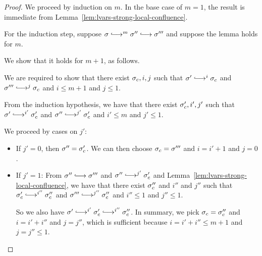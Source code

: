 \begin{proof}
  We proceed by induction on $m$.  In the base case of $m = 1$, the
  result is immediate from
  Lemma~\ref{lem:lvars-strong-local-confluence}.

  For the induction step, suppose $\conf \parstepsto^m \conf''
  \parstepsto \conf'''$ and suppose the lemma holds for $m$.

  We show that it holds for $m + 1$, as follows.

  We are required to show that there exist $\sigma_c, i, j$ such that
  $\conf' \parstepsto^{i} \conf_c$ and $\conf''' \parstepsto^{j}
  \conf_c$ and $i \leq m + 1$ and $j \leq 1$.

  From the induction hypothesis, we have that there exist $\sigma_c',
  i', j'$ such that $\conf' \parstepsto^{i'} \conf_c'$ and $\conf''
  \parstepsto^{j'} \conf_c'$ and $i' \leq m$ and $j' \leq 1$.

  We proceed by cases on $j'$:
  \begin{itemize}

  \item If $j' = 0$, then $\sigma'' = \sigma_c'$.  We can then
    choose $\sigma_c = \sigma'''$ and $i = i' + 1$ and $j = 0$.
    
  \item If $j' = 1$: From $\conf'' \parstepsto \conf'''$ and $\conf''
    \parstepsto^{j'} \conf_c'$ and
    Lemma~\ref{lem:lvars-strong-local-confluence}, we have that there
    exist $\sigma_c''$ and $i''$ and $j''$ such that $\conf'_c
    \parstepsto^{i''} \conf_c''$ and $\conf''' \parstepsto^{j''}
    \conf_c''$ and $i'' \leq 1$ and $j'' \leq 1$.

    So we also have $\conf' \parstepsto^{i'} \conf_c'
    \parstepsto^{i''} \conf_c''$.  In summary, we pick $\sigma_c =
    \sigma_c''$ and $i = i' + i''$ and $j = j''$, which is sufficient
    because $i = i' + i'' \leq m + 1$ and $j = j'' \leq 1$.
  \end{itemize}

 \end{proof}

